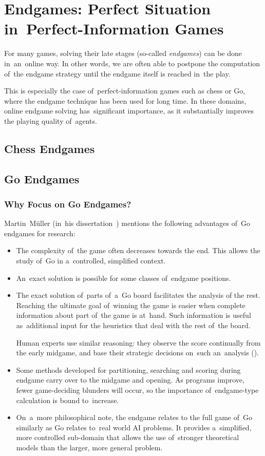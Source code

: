 \chapter{Endgames: Perfect Situation in~Perfect-Information Games}

For many games, solving their late stages (so-called \emph{endgames}) can be done in~an~online way.
In other words, we are often able to postpone the computation of~the endgame strategy until the endgame itself is reached in~the play.

This is especially the case of~perfect-information games such as chess or Go, where the endgame technique has been used for long time.
In these domains, online endgame solving has~significant importance, as it substantially improves the playing quality of~agents.

\section{Chess Endgames}
\todo

\section{Go Endgames}
\todo

\subsection{Why Focus on Go Endgames?}

Martin~M{\"u}ller (in~his dissertation~\cite{Muller1995computer}) mentions the following advantages of~Go endgames for research:
\begin{itemize}
  \item The complexity of~the game often decreases towards the end.
    This allows the study of~Go in a~controlled, simplified context.
  \item An~exact solution is possible for some classes of~endgame positions.
  \item The exact solution of~parts of~a~Go board facilitates the analysis of the rest.
    Reaching the ultimate goal of~winning the game is easier when complete information about part of~the game is at~hand.
    Such information is useful as~additional input for the heuristics that deal with the rest of~the board.

    Human experts use similar reasoning: they observe the score continually from the early midgame, and base their strategic decisions on~such an~analysis (\cite{Takagawa85}).
  \item Some methods developed for partitioning, searching and scoring during endgame carry over to the midgame and opening.
    As programs improve, fewer game-deciding blunders will occur, so the importance of~endgame-type calculation is bound to~increase.
  \item On~a~more philosophical note, the endgame relates to the full game of~Go similarly as Go relates to~real world AI problems.
    It provides a~simplified, more controlled sub-domain that allows the use of~stronger theoretical models than the larger, more general problem.
\end{itemize}

